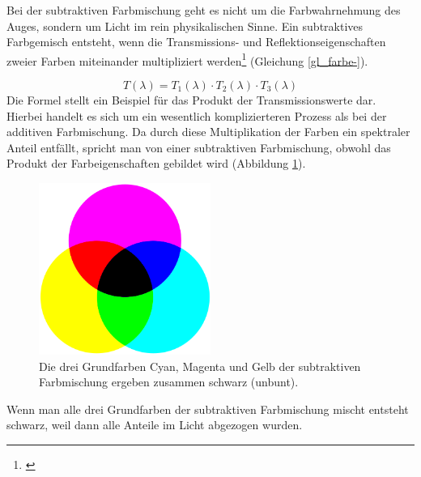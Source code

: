 
Bei der subtraktiven Farbmischung geht es nicht um die Farbwahrnehmung des Auges, sondern um Licht im rein physikalischen Sinne. Ein subtraktives Farbgemisch entsteht, wenn die Transmissions- und Reflektionseigenschaften zweier Farben miteinander multipliziert werden\footnote{\cite[84]{greule}} (Gleichung \ref{gl_farbe-}).

\begin{equation}\label{gl_farbe-}
		T(\lambda) = T_{1}(\lambda) \cdot T_{2}(\lambda) \cdot T_{3}(\lambda)
	\end{equation}
Die Formel stellt ein Beispiel für das Produkt der Transmissionswerte dar.
Hierbei handelt es sich um ein wesentlich komplizierteren Prozess als bei der additiven Farbmischung. Da durch diese Multiplikation der Farben ein spektraler Anteil entfällt, spricht man von einer subtraktiven Farbmischung, obwohl das Produkt der Farbeigenschaften gebildet wird (Abbildung \ref{b_farben-}).

\begin{figure}[H]     %
\centering
\includegraphics[width=0.5\textwidth]{bilder/farben-} 
\caption {Die drei Grundfarben Cyan, Magenta und Gelb der subtraktiven Farbmischung ergeben zusammen schwarz (unbunt).\protect\footnotemark}\label{b_farben-}
\end{figure}



Wenn man alle drei Grundfarben der subtraktiven Farbmischung mischt entsteht schwarz, weil dann alle Anteile im Licht abgezogen wurden.

